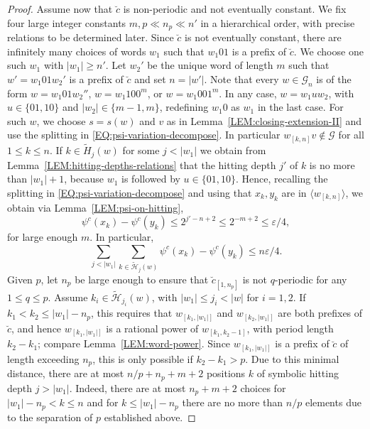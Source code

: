 \documentclass[10pt,a4paper]{amsart}
\newcommand{\mc}{\mathcal}
\begin{document}
\begin{proof}
Assume now that $\breve{c}$ is non-periodic and not eventually constant.
We fix four large integer constants $m, p \ll n_p \ll n'$ in a hierarchical order, with precise relations to be determined later. Since $\breve{c}$ is not eventually constant, there are infinitely many choices of words $w_1$ such that $w_1 01$ is a prefix of $\breve{c}$. We choose one such $w_1$ with $|w_1| \geqslant n'$. Let $w_2'$ be the unique word of length $m$ such that $w' = w_1 01 w_2'$ is a prefix of $\breve{c}$ and set $n = |w'|$. 
Note that every $w \in \mc G_n$ is of the form $w = w_1 01 w_2''$, $w = w_1 10 0^m$, or $w = w_1 00 1^m$. In any case, $w = w_1 u w_2$,
with $u \in \{01,10\}$ and $|w_2| \in \{m-1,m\}$, redefining $w_1 0$ as $w_1$ in the last case.
For such $w$, we choose $s=s(w)$ and $v$ as in Lemma~\ref{LEM:closing-extension-II} and use the splitting in \eqref{EQ:psi-variation-decompose}. In particular $w_{[k,n]}v \notin \mc G$ for all $1 \leqslant k \leqslant n$.
If $k \in \widetilde{H}_{j}(w)$ for some $j<|w_1|$ 
we obtain from Lemma~\ref{LEM:hitting-depths-relations} that the hitting depth $j'$ of $k$ is no more than $|w_1| + 1$,
because $w_1$ is followed by $u \in \{01,10\}$.
Hence, recalling the splitting in \eqref{EQ:psi-variation-decompose} and using that $x_{k},y_k$ are in $\langle w_{[k,n]}\rangle$, we obtain via Lemma~\ref{LEM:psi-on-hitting},
 \[
\psi^c(x_k) - \psi^c(y_k) \leqslant 2^{j'-n+2} \leqslant 2^{-m+2} \leqslant \varepsilon/4,
\]
for large enough $m$. In particular,
\[
\sum_{j < |w_1|} \sum_{k \in \widetilde{\mc H}_j(w)} \psi^c(x_k) - \psi^c(y_k) \leqslant n \varepsilon/4.
\]
Given $p$, let $n_p$ be large enough to ensure that $\breve{c}_{[1,n_p]}$ is not $q$-periodic for any $1\leqslant q \leqslant p$. 
Assume $k_i \in \widetilde{\mc H}_{j_i}(w)$, with $|w_1| \leqslant j_i < |w|$ for $i =1,2$.
If $k_1 < k_2 \leqslant |w_1|- n_p$, this requires that $w_{[k_1,|w_1|]}$ and $w_{[k_2,|w_1|]}$ are both prefixes of $\breve{c}$, and hence $w_{[k_1,|w_1|]}$ is a rational power of $w_{[k_1,k_2-1]}$, with period length $k_2 - k_1$; compare Lemma~\ref{LEM:word-power}. 
Since $w_{[k_1,|w_1|]}$ is a prefix of $\breve{c}$ of length exceeding $n_p$, this is only possible if $k_2 - k_1 > p$. Due to this minimal distance, there are at most $n/p + n_p + m  + 2$ positions $k$ of symbolic hitting depth $j > |w_1|$. Indeed, there are at most $n_p + m + 2$ choices for $|w_1| - n_p < k \leqslant n$ and for $k \leqslant |w_1| - n_p$ there are no more than $n/p$ elements due to the separation of $p$ established above.


\end{proof}
\end{document}
